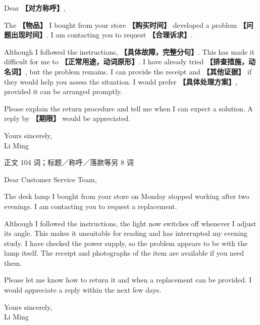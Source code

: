 \documentclass[11pt,a4paper,fontset=macnew]{ctexart}
\newenvironment{writing}{\begingroup\fontsize{10.5}{13.5}\selectfont\setlength{\parskip}{3pt}}{\par\endgroup}
\newenvironment{example}{\begingroup\fontsize{11}{14.3}\selectfont\setlength{\parskip}{4pt}}{\par\endgroup}
\begin{document}
\begin{writing}
\noindent Dear {\bfseries 【对方称呼】},\par
The {\bfseries 【物品】} I bought from your store {\bfseries 【购买时间】} developed a problem {\bfseries 【问题出现时间】}. I am contacting you to request {\bfseries 【合理诉求】}.

Although I followed the instructions, {\bfseries 【具体故障，完整分句】}. This has made it difficult for me to {\bfseries 【正常用途，动词原形】}. I have already tried {\bfseries 【排查措施，动名词】}, but the problem remains. I can provide the receipt and {\bfseries 【其他证据】} if they would help you assess the situation. I would prefer {\bfseries 【具体处理方案】}, provided it can be arranged promptly.

Please explain the return procedure and tell me when I can expect a solution. A reply by {\bfseries 【期限】} would be appreciated.

\noindent Yours sincerely,\\Li Ming\par
\end{writing}
\par\vspace{4pt}{\bfseries 完整套用示例}\par\nopagebreak
{\small 正文 104 词；标题／称呼／落款等另 8 词}\par
\begin{example}
\noindent Dear Customer Service Team,\par
The desk lamp I bought from your store on Monday stopped working after two evenings. I am contacting you to request a replacement.

Although I followed the instructions, the light now switches off whenever I adjust its angle. This makes it unsuitable for reading and has interrupted my evening study. I have checked the power supply, so the problem appears to be with the lamp itself. The receipt and photographs of the item are available if you need them.

Please let me know how to return it and when a replacement can be provided. I would appreciate a reply within the next few days.

\noindent Yours sincerely,\\Li Ming\par
\end{example}
\par\vspace{4pt}{\bfseries 好词好句：优先记这三处}\par\nopagebreak
\end{document}
